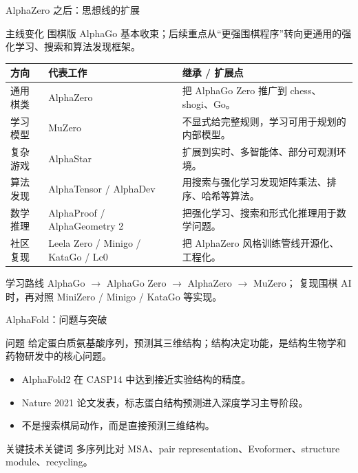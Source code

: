 \documentclass[UTF8,aspectratio=169,10pt]{ctexbeamer}
\begin{document}
\begin{frame}{AlphaZero 之后：思想线的扩展}
  \footnotesize
  \begin{alertblock}{主线变化}
    围棋版 AlphaGo 基本收束；后续重点从“更强围棋程序”转向更通用的强化学习、搜索和算法发现框架。
  \end{alertblock}

  \begin{center}
    \begin{tabular}{@{}>{\raggedright\arraybackslash}p{}>{\raggedright\arraybackslash}p{}>{\raggedright\arraybackslash}p{}@{}}
      \toprule
      方向 & 代表工作 & 继承 / 扩展点 \\
      \midrule
      通用棋类 &
      AlphaZero &
      把 AlphaGo Zero 推广到 chess、shogi、Go。 \\
      学习模型 &
      MuZero &
      不显式给完整规则，学习可用于规划的内部模型。 \\
      复杂游戏 &
      AlphaStar &
      扩展到实时、多智能体、部分可观测环境。 \\
      算法发现 &
      AlphaTensor / AlphaDev &
      用搜索与强化学习发现矩阵乘法、排序、哈希等算法。 \\
      数学推理 &
      AlphaProof / AlphaGeometry 2 &
      把强化学习、搜索和形式化推理用于数学问题。 \\
      社区复现 &
      Leela Zero / Minigo / KataGo / Lc0 &
      把 AlphaZero 风格训练管线开源化、工程化。 \\
      \bottomrule
    \end{tabular}
  \end{center}

  \begin{block}{学习路线}
    AlphaGo $\rightarrow$ AlphaGo Zero $\rightarrow$ AlphaZero $\rightarrow$ MuZero；
    复现围棋 AI 时，再对照 MiniZero / Minigo / KataGo 等实现。
  \end{block}
\end{frame}

\begin{frame}{AlphaFold：问题与突破}
  \small
  \begin{block}{问题}
    给定蛋白质氨基酸序列，预测其三维结构；结构决定功能，是结构生物学和药物研发中的核心问题。
  \end{block}

  \begin{itemize}
    \item AlphaFold2 在 CASP14 中达到接近实验结构的精度。
    \item Nature 2021 论文发表，标志蛋白结构预测进入深度学习主导阶段。
    \item 不是搜索棋局动作，而是直接预测三维结构。
  \end{itemize}

  \begin{alertblock}{关键技术关键词}
    多序列比对 MSA、pair representation、Evoformer、structure module、recycling。
  \end{alertblock}
\end{frame}
\end{document}
